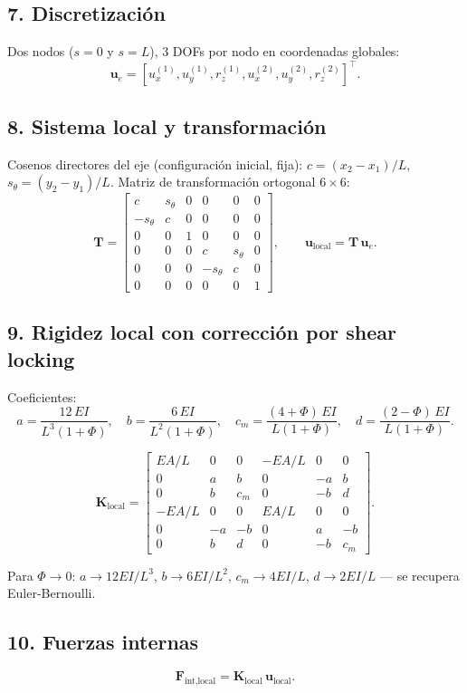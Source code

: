 \documentclass[11pt,letterpaper,oneside]{report}
\begin{document}
\subsection{7. Discretización}
Dos nodos ($s = 0$ y $s = L$), 3 DOFs por nodo en coordenadas globales:
\[
\mathbf u_e = [u_x^{(1)}, u_y^{(1)}, r_z^{(1)}, u_x^{(2)}, u_y^{(2)}, r_z^{(2)}]^\top.
\]

\subsection{8. Sistema local y transformación}
Cosenos directores del eje (configuración inicial, fija): $c = (x_2 - x_1)/L$, $s_\theta = (y_2 - y_1)/L$. Matriz de transformación ortogonal $6\times 6$:
\[
\mathbf T = \begin{bmatrix}
 c & s_\theta & 0 & 0 & 0 & 0 \\
-s_\theta & c & 0 & 0 & 0 & 0 \\
 0 & 0 & 1 & 0 & 0 & 0 \\
 0 & 0 & 0 & c & s_\theta & 0 \\
 0 & 0 & 0 & -s_\theta & c & 0 \\
 0 & 0 & 0 & 0 & 0 & 1
\end{bmatrix}, \qquad \mathbf u_{\text{local}} = \mathbf T\,\mathbf u_e.
\]

\subsection{9. Rigidez local con corrección por shear locking}
Coeficientes:
\[
a = \frac{12\,EI}{L^3(1+\Phi)}, \quad b = \frac{6\,EI}{L^2(1+\Phi)}, \quad c_m = \frac{(4+\Phi)\,EI}{L(1+\Phi)}, \quad d = \frac{(2-\Phi)\,EI}{L(1+\Phi)}.
\]

\[
\mathbf K_{\text{local}} = \begin{bmatrix}
 EA/L & 0 & 0 & -EA/L & 0 & 0 \\
 0 & a & b & 0 & -a & b \\
 0 & b & c_m & 0 & -b & d \\
-EA/L & 0 & 0 & EA/L & 0 & 0 \\
 0 & -a & -b & 0 & a & -b \\
 0 & b & d & 0 & -b & c_m
\end{bmatrix}.
\]

Para $\Phi \to 0$: $a \to 12EI/L^3$, $b \to 6EI/L^2$, $c_m \to 4EI/L$, $d \to 2EI/L$ --- se recupera Euler-Bernoulli.

\subsection{10. Fuerzas internas}
\[
\mathbf F_{\text{int,local}} = \mathbf K_{\text{local}}\,\mathbf u_{\text{local}}.
\]
\end{document}

